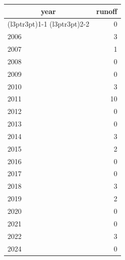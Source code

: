 \footnotesize\begin{tabular}[t]{lr}
\toprule
\multicolumn{1}{c}{year} & \multicolumn{1}{c}{runoff} \\
\cmidrule(l{3pt}r{3pt}){1-1} \cmidrule(l{3pt}r{3pt}){2-2}
  & 0\\
\midrule
2006 & 3\\
2007 & 1\\
2008 & 0\\
2009 & 0\\
2010 & 3\\
2011 & 10\\
2012 & 0\\
2013 & 0\\
2014 & 3\\
2015 & 2\\
2016 & 0\\
2017 & 0\\
2018 & 3\\
2019 & 2\\
2020 & 0\\
2021 & 0\\
2022 & 3\\
2024 & 0\\
\bottomrule
\end{tabular}
